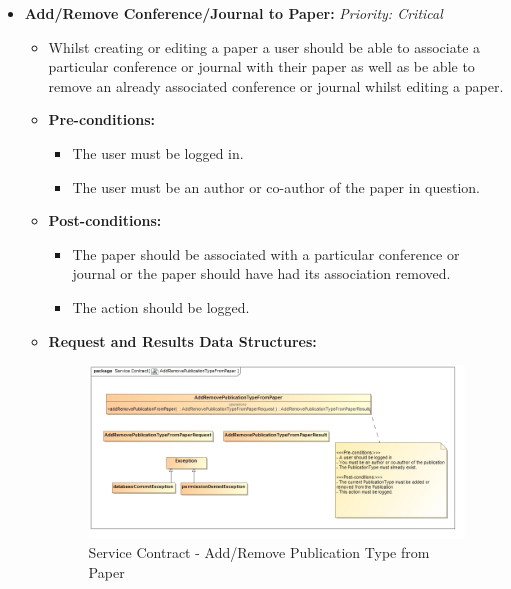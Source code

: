 \documentclass{article}
\begin{document}
\begin{itemize}
					\cleardoublepage
					\item \textbf{Add/Remove Conference/Journal to Paper:} \hfill \textit{Priority: Critical}
					\begin{itemize}
						\item Whilst creating or editing a paper a user should be able to associate a particular conference or journal with their paper as well as be able to remove an already associated conference or journal whilst editing a paper.
						\item \textbf{Pre-conditions:}
						\begin{itemize}
							\item The user must be logged in.
							\item The user must be an author or co-author of the paper in question.
						\end{itemize}
						\item \textbf{Post-conditions:}
						\begin{itemize}
							\item The paper should be associated with a particular conference or journal or the paper should have had its association removed.
							\item The action should be logged.
						\end{itemize}
						\item \textbf{Request and Results Data Structures:}
						\begin{figure}[H]
							\includegraphics[width=\linewidth]{../Diagrams/ServiceContracts/Publication subsystem/AddRemovePublicationTypeFromPaper.jpg}
							\caption{Service Contract - Add/Remove Publication Type from Paper}
						\end{figure}
					\end{itemize}									
					

\end{itemize}
\end{document}
